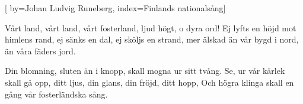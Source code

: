 %

[
  by={Johan Ludvig Runeberg},
  index={Finlands nationalsång}]  
  
\beginverse*
Vårt land, vårt land, vårt fosterland,
ljud högt, o dyra ord!
Ej lyfts en höjd mot himlens rand,
ej sänks en dal, ej sköljs en strand,
mer älskad än vår bygd i nord,
än våra fäders jord.
\endverse

\beginverse*
Din blomning, sluten än i knopp,
skall mogna ur sitt tvång.
Se, ur vår kärlek skall gå opp,
ditt ljus, din glans, din fröjd, ditt hopp,
Och högra klinga skall en gång
vår fosterländska sång.
\endverse
\endsong
